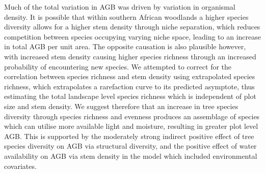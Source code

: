 \begin{refsection}
Much of the total variation in AGB was driven by variation in organismal density. It is possible that within southern African woodlands a higher species diversity allows for a higher stem density through niche separation, which reduces competition between species occupying varying niche space, leading to an increase in total AGB per unit area. The opposite causation is also plausible however, with increased stem density causing higher species richness through an increased probability of encountering new species. We attempted to correct for the correlation between species richness and stem density using extrapolated species richness, which extrapolates a rarefaction curve to its predicted asymptote, thus estimating the total landscape level species richness which is independent of plot size and stem density. We suggest therefore that an increase in tree species diversity through species richness and evenness produces an assemblage of species which can utilise more available light and moisture, resulting in greater plot level AGB. This is supported by the moderately strong indirect positive effect of tree species diversity on AGB via structural diversity, and the positive effect of water availability on AGB via stem density in the model which included environmental covariates. 


\end{refsection}
